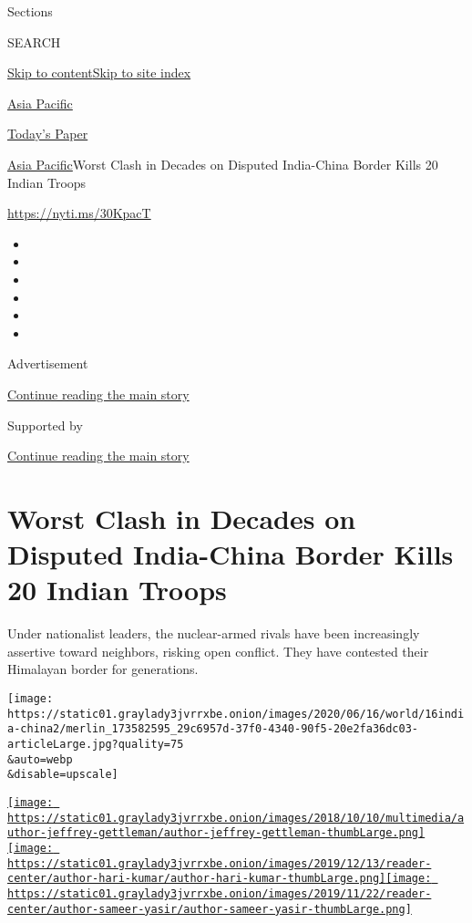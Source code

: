 Sections

SEARCH

\protect\hyperlink{site-content}{Skip to
content}\protect\hyperlink{site-index}{Skip to site index}

\href{https://www.nytimes3xbfgragh.onion/section/world/asia}{Asia
Pacific}

\href{https://myaccount.nytimes3xbfgragh.onion/auth/login?response_type=cookie\&client_id=vi}{}

\href{https://www.nytimes3xbfgragh.onion/section/todayspaper}{Today's
Paper}

\href{/section/world/asia}{Asia Pacific}\textbar{}Worst Clash in Decades
on Disputed India-China Border Kills 20 Indian Troops

\url{https://nyti.ms/30KpacT}

\begin{itemize}
\item
\item
\item
\item
\item
\item
\end{itemize}

Advertisement

\protect\hyperlink{after-top}{Continue reading the main story}

Supported by

\protect\hyperlink{after-sponsor}{Continue reading the main story}

\hypertarget{worst-clash-in-decades-on-disputed-india-china-border-kills-20-indian-troops}{%
\section{Worst Clash in Decades on Disputed India-China Border Kills 20
Indian
Troops}\label{worst-clash-in-decades-on-disputed-india-china-border-kills-20-indian-troops}}

Under nationalist leaders, the nuclear-armed rivals have been
increasingly assertive toward neighbors, risking open conflict. They
have contested their Himalayan border for generations.

\texttt{[image: https://static01.graylady3jvrrxbe.onion/images/2020/06/16/world/16india-china2/merlin\_173582595\_29c6957d-37f0-4340-90f5-20e2fa36dc03-articleLarge.jpg?quality=75\\\&auto=webp\\\&disable=upscale]}

\href{https://www.nytimes3xbfgragh.onion/by/jeffrey-gettleman}{\texttt{[image: https://static01.graylady3jvrrxbe.onion/images/2018/10/10/multimedia/author-jeffrey-gettleman/author-jeffrey-gettleman-thumbLarge.png]}}\href{https://www.nytimes3xbfgragh.onion/by/hari-kumar}{\texttt{[image: https://static01.graylady3jvrrxbe.onion/images/2019/12/13/reader-center/author-hari-kumar/author-hari-kumar-thumbLarge.png]}}\href{https://www.nytimes3xbfgragh.onion/by/sameer-yasir}{\texttt{[image: https://static01.graylady3jvrrxbe.onion/images/2019/11/22/reader-center/author-sameer-yasir/author-sameer-yasir-thumbLarge.png]}}

